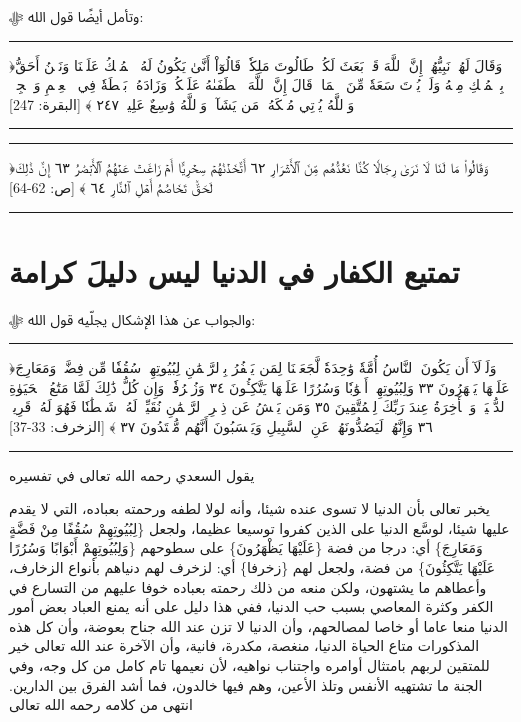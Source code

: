 \documentclass[12pt,openany]{book}
\newenvironment{quranblock}
  {\par\medskip\begin{center}\begin{minipage}{0.92\linewidth}\centering\quranfont\large\color{ink}\hrule\vspace{0.65em}}
  {\vspace{0.65em}\hrule\end{minipage}\end{center}\medskip}
\newenvironment{sourceintro}
  {\par\medskip\noindent\titlefont\color{gold}}
  {\par\smallskip}
\begin{document}
وتأمل أيضًا قول الله ﷻ:

\begin{quranblock}
﴿وَقَالَ لَهُمۡ نَبِيُّهُمۡ إِنَّ ٱللَّهَ قَدۡ بَعَثَ لَكُمۡ ‌طَالُوتَ مَلِكٗاۚ قَالُوٓاْ أَنَّىٰ يَكُونُ لَهُ ٱلۡمُلۡكُ عَلَيۡنَا وَنَحۡنُ أَحَقُّ بِٱلۡمُلۡكِ مِنۡهُ وَلَمۡ يُؤۡتَ سَعَةٗ مِّنَ ٱلۡمَالِۚ قَالَ إِنَّ ٱللَّهَ ٱصۡطَفَىٰهُ عَلَيۡكُمۡ وَزَادَهُۥ بَسۡطَةٗ فِي ٱلۡعِلۡمِ وَٱلۡجِسۡمِۖ وَٱللَّهُ يُؤۡتِي مُلۡكَهُۥ مَن يَشَآءُۚ وَٱللَّهُ وَٰسِعٌ عَلِيمٞ ٢٤٧ ﴾ [البقرة: 247]
\end{quranblock}

\begin{quranblock}
﴿وَقَالُواْ مَا لَنَا لَا نَرَىٰ رِجَالٗا كُنَّا نَعُدُّهُم مِّنَ ٱلۡأَشۡرَارِ ٦٢ أَتَّخَذۡنَٰهُمۡ سِخۡرِيًّا أَمۡ زَاغَتۡ عَنۡهُمُ ٱلۡأَبۡصَٰرُ ٦٣ إِنَّ ذَٰلِكَ لَحَقّٞ ‌تَخَاصُمُ ‌أَهۡلِ ‌ٱلنَّارِ ٦٤ ﴾ [ص: 62-64]
\end{quranblock}

\section{تمتيع الكفار في الدنيا ليس دليلَ كرامة}
والجواب عن هذا الإشكال يجلّيه قول الله ﷻ:

\begin{quranblock}
﴿وَلَوۡلَآ أَن يَكُونَ ٱلنَّاسُ أُمَّةٗ وَٰحِدَةٗ لَّجَعَلۡنَا لِمَن يَكۡفُرُ بِٱلرَّحۡمَٰنِ لِبُيُوتِهِمۡ سُقُفٗا مِّن فِضَّةٖ وَمَعَارِجَ عَلَيۡهَا يَظۡهَرُونَ ٣٣ وَلِبُيُوتِهِمۡ أَبۡوَٰبٗا وَسُرُرًا عَلَيۡهَا يَتَّكِـُٔونَ ٣٤ وَزُخۡرُفٗاۚ وَإِن كُلُّ ذَٰلِكَ لَمَّا مَتَٰعُ ٱلۡحَيَوٰةِ ٱلدُّنۡيَاۚ وَٱلۡأٓخِرَةُ عِندَ رَبِّكَ لِلۡمُتَّقِينَ ٣٥ وَمَن يَعۡشُ عَن ذِكۡرِ ٱلرَّحۡمَٰنِ نُقَيِّضۡ لَهُۥ شَيۡطَٰنٗا فَهُوَ لَهُۥ قَرِينٞ ٣٦ وَإِنَّهُمۡ لَيَصُدُّونَهُمۡ عَنِ ٱلسَّبِيلِ وَيَحۡسَبُونَ أَنَّهُم مُّهۡتَدُونَ ٣٧ ﴾ [الزخرف: 33-37]
\end{quranblock}

\begin{sourceintro}يقول السعدي رحمه الله تعالى في تفسيره\end{sourceintro}

يخبر تعالى بأن الدنيا لا تسوى عنده شيئا، وأنه لولا لطفه ورحمته بعباده، التي لا يقدم عليها شيئا، لوسَّع الدنيا على الذين كفروا توسيعا عظيما، ولجعل \{لِبُيُوتِهِمْ سُقُفًا مِنْ فَضَّةٍ وَمَعَارِجَ\} أي: درجا من فضة \{عَلَيْهَا يَظْهَرُونَ\} على سطوحهم \{وَلِبُيُوتِهِمْ أَبْوَابًا وَسُرُرًا عَلَيْهَا يَتَّكِئُونَ\} من فضة، ولجعل لهم \{زخرفا\} أي: لزخرف لهم دنياهم بأنواع الزخارف، وأعطاهم ما يشتهون، ولكن منعه من ذلك رحمته بعباده خوفا عليهم من التسارع في الكفر وكثرة المعاصي بسبب حب الدنيا، ففي هذا دليل على أنه يمنع العباد بعض أمور الدنيا منعا عاما أو خاصا لمصالحهم، وأن الدنيا لا تزن عند الله جناح بعوضة، وأن كل هذه المذكورات متاع الحياة الدنيا، منغصة، مكدرة، فانية، وأن الآخرة عند الله تعالى خير للمتقين لربهم بامتثال أوامره واجتناب نواهيه، لأن نعيمها تام كامل من كل وجه، وفي الجنة ما تشتهيه الأنفس وتلذ الأعين، وهم فيها خالدون، فما أشد الفرق بين الدارين. انتهى من كلامه رحمه الله تعالى
\end{document}
